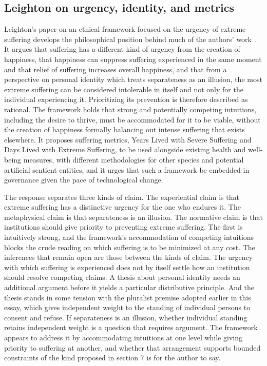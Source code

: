 \documentclass[11pt]{article}
\begin{document}
\subsection{Leighton on urgency, identity, and metrics}

Leighton's paper on an ethical framework focused on the urgency of extreme suffering develops the philosophical position behind much of the authors' work \citep{leighton2025}. It argues that suffering has a different kind of urgency from the creation of happiness, that happiness can suppress suffering experienced in the same moment and that relief of suffering increases overall happiness, and that from a perspective on personal identity which treats separateness as an illusion, the most extreme suffering can be considered intolerable in itself and not only for the individual experiencing it. Prioritizing its prevention is therefore described as rational. The framework holds that strong and potentially competing intuitions, including the desire to thrive, must be accommodated for it to be viable, without the creation of happiness formally balancing out intense suffering that exists elsewhere. It proposes suffering metrics, Years Lived with Severe Suffering and Days Lived with Extreme Suffering, to be used alongside existing health and well-being measures, with different methodologies for other species and potential artificial sentient entities, and it urges that such a framework be embedded in governance given the pace of technological change.

The response separates three kinds of claim. The experiential claim is that extreme suffering has a distinctive urgency for the one who endures it. The metaphysical claim is that separateness is an illusion. The normative claim is that institutions should give priority to preventing extreme suffering. The first is intuitively strong, and the framework's accommodation of competing intuitions blocks the crude reading on which suffering is to be minimized at any cost. The inferences that remain open are those between the kinds of claim. The urgency with which suffering is experienced does not by itself settle how an institution should resolve competing claims. A thesis about personal identity needs an additional argument before it yields a particular distributive principle. And the thesis stands in some tension with the pluralist premise adopted earlier in this essay, which gives independent weight to the standing of individual persons to consent and refuse. If separateness is an illusion, whether individual standing retains independent weight is a question that requires argument. The framework appears to address it by accommodating intuitions at one level while giving priority to suffering at another, and whether that arrangement supports bounded constraints of the kind proposed in section 7 is for the author to say.
\end{document}

